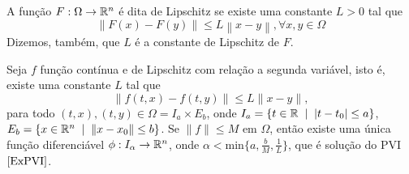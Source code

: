 \begin{definition}
    A função $F:\Omega\to\mathbb{R}^n$ é dita de Lipschitz se existe uma constante $L>0$ tal que
    \begin{equation*}
        \left\|F(x)-F(y)\right\| \leq L\left\|x-y \right\|,\forall x,y\in\Omega
    \end{equation*}
    Dizemos, também, que $L$ é a constante de Lipschitz de $F$.
\end{definition}

\begin{theorem}
    \label{teoPicard}
    Seja $f$ função contínua e de Lipschitz com relação a segunda variável, isto é, existe uma constante $L$ tal que
    \begin{equation*}
        \|f(t,x) - f(t,y)\| \leq L\|x-y\|,
    \end{equation*}
    para todo $(t,x),(t,y)\in\Omega=I_a\times E_b$, onde $I_a=\{t\in\mathbb{R}\;\mid\; |t-t_0|\leq a\}$, $E_b=\{{x\in\mathbb{R}^n}\;\mid\; \|x-x_0\|\leq b\}$. Se $\|f\|\leq M$ em $\Omega$, então existe uma única função diferenciável $\phi:I_\alpha\to\mathbb{R}^n$, onde $\alpha<\text{min}\{a,\frac{b}{M},\frac{1}{L}\}$, que é solução do PVI $\eqref{ExPVI}$.
\end{theorem}
\raggedbottom
